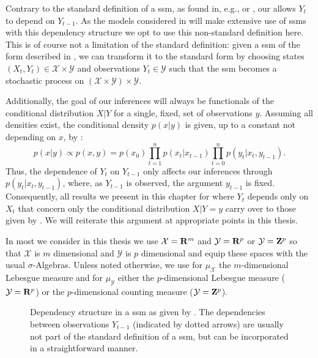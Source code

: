 \begin{remark}
    \label{rem:dependence_Yt-1}
    Contrary to the standard definition of a \gls{ssm}, as found in, e.g., \citep[Chapter 2]{Chopin2020Introduction} or \citep[Chapter 9]{Durbin2012Time}, our  allows $Y_t$ to depend on $Y_{t - 1}$.
    As the models considered in  will make extensive use of \glspl{ssm} with this dependency structure we opt to use this non-standard definition here.
    This is of course not a limitation of the standard definition: given a \gls{ssm} of the form described in , we can transform it to the standard form by choosing states $(X_t, Y_t) \in \mathcal X \times \mathcal Y$ and observations $Y_t \in \mathcal Y$ such that the \gls{ssm} becomes a stochastic process on $ \left( \mathcal X \times \mathcal Y\right) \times \mathcal Y$.

    Additionally, the goal of our inferences will always be functionals of the conditional distribution $X|Y$ for a single, fixed, set of observations $y$. Assuming all densities exist, the conditional density $p(x|y)$ is given, up to a constant not depending on $x$, by :
    $$
    p(x|y) \propto p(x,y) =p (x_0)\prod_{t = 1}^{n} p(x_{t}|x_{t - 1}) \prod_{t = 0}^{n} p(y_t | x_t, y_{t - 1}).
    $$
    Thus, the dependence of $Y_{t}$ on $Y_{t - 1}$ only affects our inferences through $p(y_{t} | x_{t}, y_{t - 1})$, where, as $Y_{t - 1}$ is observed, the argument $y_{t - 1}$ is fixed. 
    Consequently, all results we present in this chapter for  where $Y_{t}$ depends only on $X_{t}$ that concern only the conditional distribution $X|Y=y$ carry over to those given by . We will reiterate this argument at appropriate points in this thesis.

    In most  we consider in this thesis we use $\mathcal X = \mathbf R^m$ and $\mathcal Y = \mathbf R^p$ or $\mathcal Y = \mathbf Z^p$ so that $\mathcal X$ is $m$ dimensional and $\mathcal Y$ is $p$ dimensional and equip these spaces with the usual $\sigma$-Algebras. Unless noted otherwise, we use for $\mu_{\mathcal X}$ the $m$-dimensional Lebesgue measure and for $\mu_{\mathcal Y}$ either the $p$-dimensional Lebesgue measure ($\mathcal Y = \mathbf R^{p}$) or the $p$-dimensional counting measure ($\mathcal Y = \mathbf Z^{p}$).
    
\end{remark}

\begin{figure}
    \centering
    \caption{Dependency structure in a \acrshort{ssm} as given by . The dependencies between observations $Y_{t-1}$ (indicated by dotted arrows) are usually not part of the standard definition of a \acrshort{ssm}, but can be incorporated in a straightforward manner.}
    \label{fig:ssm_dependencies}
\end{figure}


